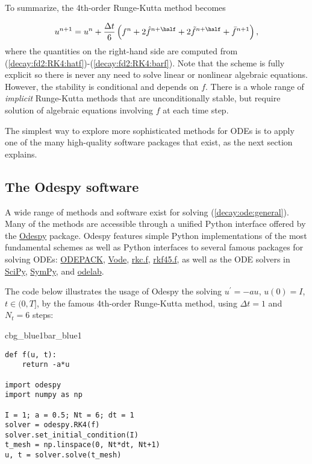 \documentclass[graybox,sectrefs,envcountresetchap,open=right,final]{svmonodo}
\newenvironment{_pro_tight}[2]{
   \def\FrameCommand{\color{#2}\vrule width 1mm\normalcolor\colorbox{#1}}
   \FrameRule0.6pt\MakeFramed {\advance\hsize-2mm\FrameRestore}\vskip3mm}
   {\vskip0mm\endMakeFramed}
\newenvironment{pro}[2]{
\bgroup\rmfamily
\fboxsep=0mm\relax
\begin{_pro_tight}{#1}{#2}
\list{}{\parsep=-2mm\parskip=0mm\topsep=0pt\leftmargin=2mm
\rightmargin=2\leftmargin\leftmargin=4pt\relax}
\item\relax}
{\endlist\end{_pro_tight}\egroup}
\begin{document}
To summarize, the 4th-order Runge-Kutta method becomes

\begin{equation}
u^{n+1} = u^n +
\frac{\Delta t}{6}\left( f^n + 2\hat{f}^{n+\half}
+ 2\tilde{f}^{n+\half} + \bar{f}^{n+1}\right),
\end{equation}
where the quantities on the right-hand side are computed from
(\ref{decay:fd2:RK4:hatf})-(\ref{decay:fd2:RK4:barf}). Note that
the scheme is fully explicit so there is never any need to solve linear or
nonlinear algebraic
equations. However, the stability is conditional and depends on $f$.
There is a whole range of \emph{implicit} Runge-Kutta methods that
are unconditionally stable, but require solution of algebraic
equations involving $f$ at each time step.

The simplest way to explore more sophisticated methods for ODEs is to
apply one of the many high-quality software packages that exist, as the
next section explains.

\subsection{The Odespy software}

A wide range of methods and software exist for solving (\ref{decay:ode:general}).
Many of the methods are accessible through a unified Python interface offered
by the \href{{https://github.com/hplgit/odespy}}{Odespy} \cite{odespy} package.
Odespy features simple Python implementations of the most fundamental
schemes as well as Python interfaces to several famous packages for
solving ODEs: \href{{https://computation.llnl.gov/casc/odepack/odepack_home.html}}{ODEPACK}, \href{{https://computation.llnl.gov/casc/odepack/odepack_home.html}}{Vode},
\href{{http://www.netlib.org/ode/rkc.f}}{rkc.f}, \href{{http://www.netlib.org/ode/rkf45.f}}{rkf45.f}, as well
as the ODE solvers in \href{{http://docs.scipy.org/doc/scipy/reference/generated/scipy.integrate.ode.html}}{SciPy}, \href{{http://docs.sympy.org/dev/modules/mpmath/calculus/odes.html}}{SymPy}, and \href{{http://olivierverdier.github.com/odelab/}}{odelab}.

The code below illustrates the usage of Odespy the solving $u^{\prime}=-au$,
$u(0)=I$, $t\in (0,T]$,
by the famous 4th-order Runge-Kutta method, using $\Delta t=1$
and $N_t=6$ steps:

\begin{pro}{cbg_blue1}{bar_blue1}\begin{Verbatim}[numbers=none,fontsize=\fontsize{9pt}{9pt},baselinestretch=0.95,xleftmargin=2mm]
def f(u, t):
    return -a*u

import odespy
import numpy as np

I = 1; a = 0.5; Nt = 6; dt = 1
solver = odespy.RK4(f)
solver.set_initial_condition(I)
t_mesh = np.linspace(0, Nt*dt, Nt+1)
u, t = solver.solve(t_mesh)
\end{Verbatim}
\end{pro}
\noindent
\end{document}
